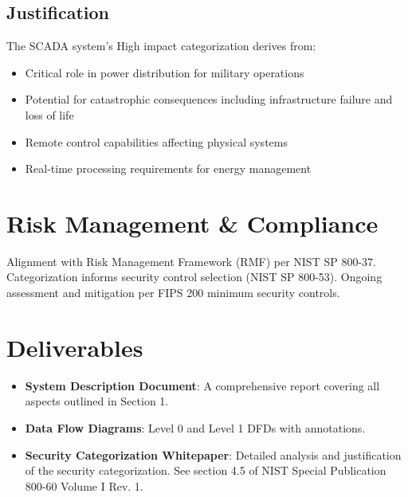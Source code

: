\documentclass{article}
\begin{document}
\subsection{Justification}
The SCADA system's High impact categorization derives from:

\begin{itemize}
\item Critical role in power distribution for military operations
\item Potential for catastrophic consequences including infrastructure failure and loss of life
\item Remote control capabilities affecting physical systems
\item Real-time processing requirements for energy management
\end{itemize}

\section{Risk Management \& Compliance}

Alignment with Risk Management Framework (RMF) per NIST SP 800-37. Categorization informs security control selection (NIST SP 800-53). Ongoing assessment and mitigation per FIPS 200 minimum security controls.

\section{Deliverables}

\begin{itemize}
    \item \textbf{System Description Document}: A comprehensive report covering all aspects outlined in Section 1.
    \item \textbf{Data Flow Diagrams}: Level 0 and Level 1 DFDs with annotations.
    \item \textbf{Security Categorization Whitepaper}: Detailed analysis and justification of the security categorization. See section 4.5 of NIST Special Publication 800-60 Volume I Rev. 1.
\end{itemize}
\end{document}

